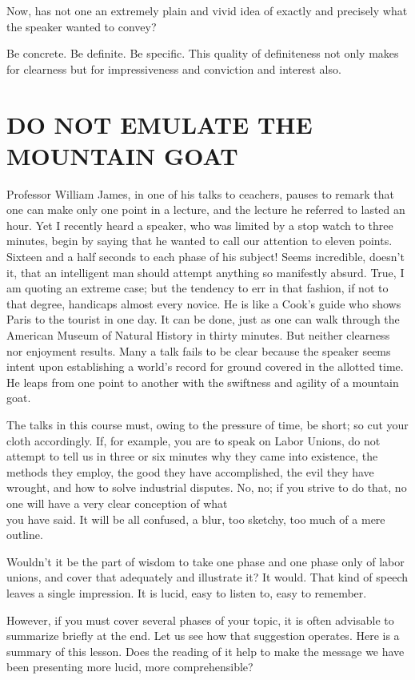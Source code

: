 \documentclass[10pt]{article}
\begin{document}
Now, has not one an extremely plain and vivid idea of exactly and precisely what the speaker wanted to convey?

Be concrete. Be definite. Be specific. This quality of definiteness not only makes for clearness but for impressiveness and conviction and interest also.

\section*{DO NOT EMULATE THE MOUNTAIN GOAT}
Professor William James, in one of his talks to ceachers, pauses to remark that one can make only one point in a lecture, and the lecture he referred to lasted an hour. Yet I recently heard a speaker, who was limited by a stop watch to three minutes, begin by saying that he wanted to call our attention to eleven points. Sixteen and a half seconds to each phase of his subject! Seems incredible, doesn't it, that an intelligent man should attempt anything so manifestly absurd. True, I am quoting an extreme case; but the tendency to err in that fashion, if not to that degree, handicaps almost every novice. He is like a Cook's guide who shows Paris to the tourist in one day. It can be done, just as one can walk through the American Museum of Natural History in thirty minutes. But neither clearness nor enjoyment results. Many a talk fails to be clear because the speaker seems intent upon establishing a world's record for ground covered in the allotted time. He leaps from one point to another with the swiftness and agility of a mountain goat.

The talks in this course must, owing to the pressure of time, be short; so cut your cloth accordingly. If, for example, you are to speak on Labor Unions, do not attempt to tell us in three or six minutes why they came into existence, the methods they employ, the good they have accomplished, the evil they have wrought, and how to solve industrial disputes. No, no; if you strive to do that, no one will have a very clear conception of what\\
you have said. It will be all confused, a blur, too sketchy, too much of a mere outline.

Wouldn't it be the part of wisdom to take one phase and one phase only of labor unions, and cover that adequately and illustrate it? It would. That kind of speech leaves a single impression. It is lucid, easy to listen to, easy to remember.

However, if you must cover several phases of your topic, it is often advisable to summarize briefly at the end. Let us see how that suggestion operates. Here is a summary of this lesson. Does the reading of it help to make the message we have been presenting more lucid, more comprehensible?
\end{document}
